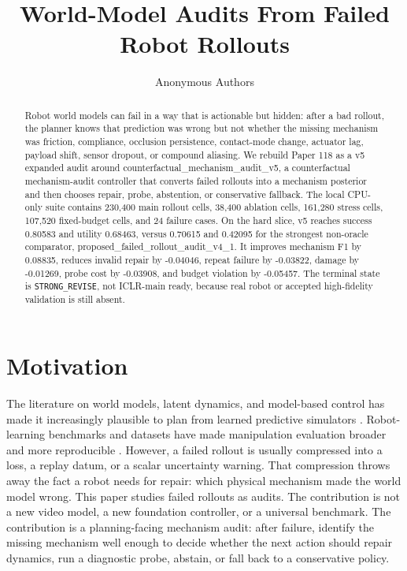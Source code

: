 \documentclass{article}
\title{World-Model Audits From Failed Robot Rollouts}
\author{Anonymous Authors}
\begin{document}
\maketitle
\begin{abstract}
Robot world models can fail in a way that is actionable but hidden: after a bad rollout, the planner knows that prediction was wrong but not whether the missing mechanism was friction, compliance, occlusion persistence, contact-mode change, actuator lag, payload shift, sensor dropout, or compound aliasing. We rebuild Paper 118 as a v5 expanded audit around counterfactual\_mechanism\_audit\_v5, a counterfactual mechanism-audit controller that converts failed rollouts into a mechanism posterior and then chooses repair, probe, abstention, or conservative fallback. The local CPU-only suite contains 230,400 main rollout cells, 38,400 ablation cells, 161,280 stress cells, 107,520 fixed-budget cells, and 24 failure cases. On the hard slice, v5 reaches success 0.80583 and utility 0.68463, versus 0.70615 and 0.42095 for the strongest non-oracle comparator, proposed\_failed\_rollout\_audit\_v4\_1. It improves mechanism F1 by 0.08835, reduces invalid repair by -0.04046, repeat failure by -0.03822, damage by -0.01269, probe cost by -0.03908, and budget violation by -0.05457. The terminal state is \texttt{STRONG\_REVISE}, not ICLR-main ready, because real robot or accepted high-fidelity validation is still absent.
\end{abstract}
\section{Motivation}
The literature on world models, latent dynamics, and model-based control has made it increasingly plausible to plan from learned predictive simulators \citep{ha2018worldmodels,chua2018pets,hafner2019planet,hafner2020dreamer,janner2019mbpo,hansen2022tdmpc}. Robot-learning benchmarks and datasets have made manipulation evaluation broader and more reproducible \citep{yu2020metaworld,james2020rlbench,mandlekar2021robomimic,mu2021maniskill,brohan2023rt1,openx2023,khazatsky2024droid}. However, a failed rollout is usually compressed into a loss, a replay datum, or a scalar uncertainty warning. That compression throws away the fact a robot needs for repair: which physical mechanism made the world model wrong.
This paper studies failed rollouts as audits. The contribution is not a new video model, a new foundation controller, or a universal benchmark. The contribution is a planning-facing mechanism audit: after failure, identify the missing mechanism well enough to decide whether the next action should repair dynamics, run a diagnostic probe, abstain, or fall back to a conservative policy.
\end{document}

